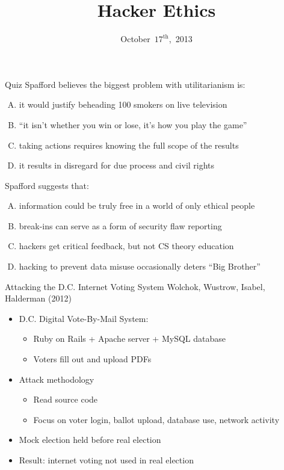 \documentclass{beamer}
\title{Hacker Ethics}
\date{October~$17^{\text{th}}$,~2013}
\begin{document}
\begin{frame}
\titlepage
\end{frame}

\begin{frame}{Quiz}
Spafford believes the biggest problem with utilitarianism is:
\begin{enumerate}[(A)]
\item<1> it would justify beheading 100 smokers on live television
\item<1> ``it isn't whether you win or lose, it's how you play the game''
\item<1-2> taking actions requires knowing the full scope of the results
\item<1> it results in disregard for due process and civil rights
\end{enumerate}
\bigskip
Spafford suggests that:
\begin{enumerate}[(A)]
\item<1-2> information could be truly free in a world of only ethical people
\item<1> break-ins can serve as a form of security flaw reporting %
\item<1> hackers get critical feedback, but not CS theory education %
\item<1> hacking to prevent data misuse occasionally deters ``Big Brother''
\end{enumerate}
\end{frame}

\begin{frame}{Attacking the D.C. Internet Voting System}
Wolchok, Wustrow, Isabel, Halderman (2012)
\begin{itemize}
\item D.C. Digital Vote-By-Mail System:
\begin{itemize}
\item Ruby on Rails + Apache server + MySQL database
\item Voters fill out and upload PDFs
\end{itemize}
\item Attack methodology
\begin{itemize}
\item Read source code
\item Focus on voter login, ballot upload, database use, network activity
\end{itemize}
\item Mock election held before real election
\item Result: internet voting not used in real election
\end{itemize}
\end{frame}
\end{document}
